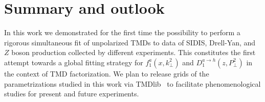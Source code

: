 \documentclass[aps,preprintnumbers,showpacs,nofootinbib,superscriptaddress,floatfix]{revtex4}
\newcommand{\T}{\perp}
\begin{document}





\section{Summary and outlook}
\label{s:conclusions}


In this work we demonstrated for the first time the possibility to perform a rigorous simultaneous fit of unpolarized TMDs to data of SIDIS, Drell-Yan, and $Z$ boson production collected by different experiments.
This constitutes the first attempt towards a global fitting strategy for $f_1^a(x,k_\perp^2)$ and $D_1^{a \to h}(z,P_\perp^2)$ in the context of TMD factorization. 
We plan to release grids of the parametrizations studied in this work via TMDlib~\cite{Hautmann:2014kza} to facilitate phenomenological studies for present and future experiments.
\end{document}
